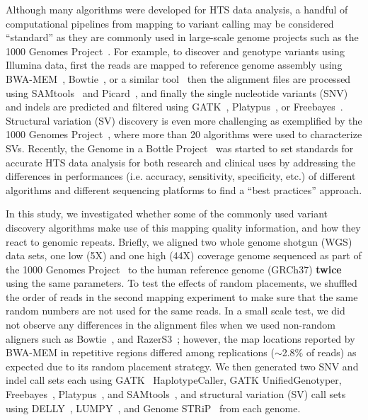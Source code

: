 \documentclass{bioinfo}
\begin{document}
Although many algorithms were developed for HTS data analysis, a handful of computational pipelines from mapping to variant calling may be considered ``standard'' as they are commonly used in large-scale genome projects such as the 1000 Genomes Project~\citep{1000GP,1000GP2012,1000GP2015}. For example, to discover and genotype variants using Illumina data, first the reads are mapped to reference genome assembly using BWA-MEM~\citep{Li2009a,Li2013}, Bowtie~\citep{Langmead2009}, or a similar tool~\citep{Alkan2009,Weese2012} then the alignment files are processed using SAMtools~\citep{Li2009b} and Picard~\citep{picard}, and finally the single nucleotide variants (SNV) and indels are predicted and filtered using GATK~\citep{DePristo2011}, Platypus~\citep{Rimmer2014}, or Freebayes~\citep{Garrison2012}. 
Structural variation (SV) discovery is even more challenging as exemplified by the 1000 Genomes Project~\citep{1000GP,1000GP2012,Mills2011}, where more than 20 algorithms were used to characterize SVs.
Recently, the Genome in a Bottle Project~\citep{Zook2014} was started to set standards for accurate HTS data analysis for both research and clinical uses by addressing the differences in performances (i.e. accuracy, sensitivity, specificity, etc.) of different algorithms and different sequencing platforms
 to find a ``best practices'' approach.

In this study, we investigated whether some of the commonly used variant discovery algorithms
make use of this mapping quality information, and how they react to genomic repeats.
Briefly, 
we aligned two whole genome shotgun (WGS) data sets, one low (5X) and one high (44X) coverage genome
sequenced as part of the 1000 Genomes Project~\citep{1000GP2012} to the human reference genome (GRCh37) {\bf twice} using the same parameters. 
To test the effects of random placements,
we shuffled the order of reads in the second mapping experiment to make sure that the same random numbers are not used for the same reads. 
In a small scale test, we did not observe any differences
in the alignment files when we used non-random aligners such as Bowtie~\citep{Langmead2009}, and RazerS3~\citep{Weese2012}; %
however, 
the map locations reported by BWA-MEM in repetitive regions differed among replications ($\sim$2.8\% of reads) as expected due to its random placement strategy.
We then generated two SNV and indel call sets each using GATK~\citep{DePristo2011} HaplotypeCaller, GATK UnifiedGenotyper, Freebayes~\citep{Garrison2012}, Platypus~\citep{Rimmer2014}, and SAMtools~\citep{Li2009b}, and structural variation (SV) call sets using DELLY~\citep{Rausch2012}, LUMPY~\citep{Layer2014}, and Genome STRiP~\citep{Handsaker2011,Handsaker2015} from each genome.
\end{document}
